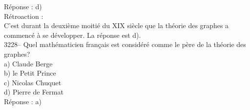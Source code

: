 \documentclass[letterpaper, 12pt]{article}
\begin{document}
R\'eponse : d)\\

R\'etroaction :\\
C'est durant la deuxi\`eme moiti\'e du {\scriptsize XIX\ieme{}} si\`ecle que la th\'eorie des graphes a commenc\'e \`a se d\'evelopper. La r\'eponse est d).\\



3228-- Quel math\'ematicien fran\c cais est consid\'er\'e comme le p\`ere de la th\'eorie des graphes?\\

a) Claude Berge\\
b) le Petit Prince\\
c) Nicolas Chuquet\\
d) Pierre de Fermat\\

R\'eponse : a)\\
\end{document}
